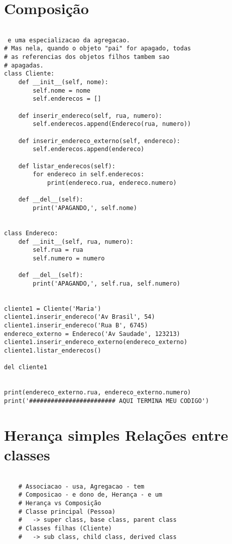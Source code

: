\documentclass{article}
\begin{document}
\section{Composição}
\begin{lstlisting}
    
 e uma especializacao da agregacao.
# Mas nela, quando o objeto "pai" for apagado, todas
# as referencias dos objetos filhos tambem sao
# apagadas.
class Cliente:
    def __init__(self, nome):
        self.nome = nome
        self.enderecos = []

    def inserir_endereco(self, rua, numero):
        self.enderecos.append(Endereco(rua, numero))

    def inserir_endereco_externo(self, endereco):
        self.enderecos.append(endereco)

    def listar_enderecos(self):
        for endereco in self.enderecos:
            print(endereco.rua, endereco.numero)

    def __del__(self):
        print('APAGANDO,', self.nome)


class Endereco:
    def __init__(self, rua, numero):
        self.rua = rua
        self.numero = numero

    def __del__(self):
        print('APAGANDO,', self.rua, self.numero)


cliente1 = Cliente('Maria')
cliente1.inserir_endereco('Av Brasil', 54)
cliente1.inserir_endereco('Rua B', 6745)
endereco_externo = Endereco('Av Saudade', 123213)
cliente1.inserir_endereco_externo(endereco_externo)
cliente1.listar_enderecos()

del cliente1


print(endereco_externo.rua, endereco_externo.numero)
print('######################## AQUI TERMINA MEU CODIGO')
\end{lstlisting}

\section{Herança simples Relações entre classes}
\begin{lstlisting}
    
    # Associacao - usa, Agregacao - tem
    # Composicao - e dono de, Herança - e um
    # Herança vs Composição
    # Classe principal (Pessoa)
    #   -> super class, base class, parent class
    # Classes filhas (Cliente)
    #   -> sub class, child class, derived class
    
\end{lstlisting}
\end{document}
